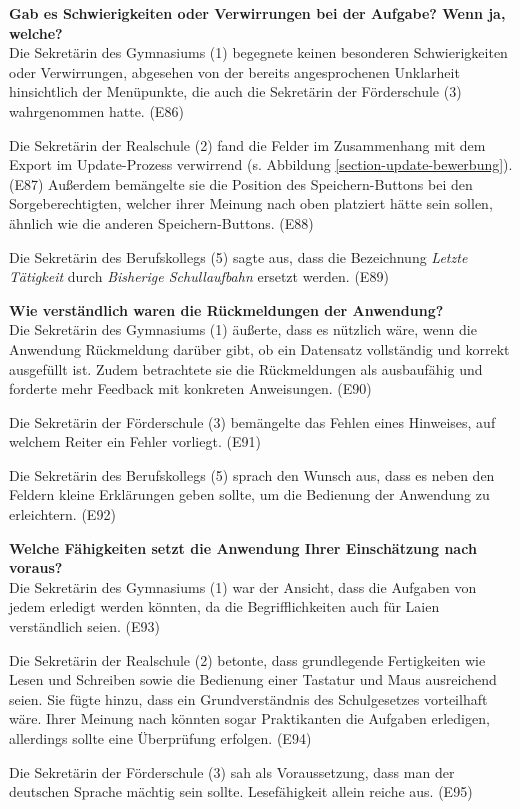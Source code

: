 \textbf{Gab es Schwierigkeiten oder Verwirrungen bei der Aufgabe? Wenn ja, welche?}\\
Die Sekretärin des Gymnasiums (1) begegnete keinen besonderen Schwierigkeiten oder Verwirrungen, abgesehen von der bereits angesprochenen Unklarheit hinsichtlich der Menüpunkte, die auch die Sekretärin der Förderschule (3) wahrgenommen hatte. (E86)

Die Sekretärin der Realschule (2) fand die Felder im Zusammenhang mit dem Export im Update-Prozess verwirrend (s. Abbildung \ref{section-update-bewerbung}). (E87) Außerdem bemängelte sie die Position des Speichern-Buttons bei den Sorgeberechtigten, welcher ihrer Meinung nach oben platziert hätte sein sollen, ähnlich wie die anderen Speichern-Buttons. (E88)

Die Sekretärin des Berufskollegs (5) sagte aus, dass die Bezeichnung \textit{Letzte Tätigkeit} durch \textit{Bisherige Schullaufbahn} ersetzt werden. (E89)

\textbf{Wie verständlich waren die Rückmeldungen der Anwendung?}\\
Die Sekretärin des Gymnasiums (1) äußerte, dass es nützlich wäre, wenn die Anwendung Rückmeldung darüber gibt, ob ein Datensatz vollständig und korrekt ausgefüllt ist. Zudem betrachtete sie die Rückmeldungen als \glqq ausbaufähig\grqq{}  und forderte mehr Feedback mit konkreten Anweisungen. (E90)

Die Sekretärin der Förderschule (3) bemängelte das Fehlen eines Hinweises, auf welchem Reiter ein Fehler vorliegt. (E91)

Die Sekretärin des Berufskollegs (5) sprach den Wunsch aus, dass es neben den Feldern kleine Erklärungen geben sollte, um die Bedienung der Anwendung zu erleichtern. (E92)

\textbf{Welche Fähigkeiten setzt die Anwendung Ihrer Einschätzung nach voraus?}\\
Die Sekretärin des Gymnasiums (1) war der Ansicht, dass die Aufgaben von jedem erledigt werden könnten, da die Begrifflichkeiten auch für Laien verständlich seien. (E93)

Die Sekretärin der Realschule (2) betonte, dass grundlegende Fertigkeiten wie Lesen und Schreiben sowie die Bedienung einer Tastatur und Maus ausreichend seien. Sie fügte hinzu, dass ein Grundverständnis des Schulgesetzes vorteilhaft wäre. Ihrer Meinung nach könnten sogar Praktikanten die Aufgaben erledigen, allerdings sollte eine Überprüfung erfolgen. (E94)

Die Sekretärin der Förderschule (3) sah als Voraussetzung, dass man der deutschen Sprache mächtig sein sollte. Lesefähigkeit allein reiche aus. (E95)

